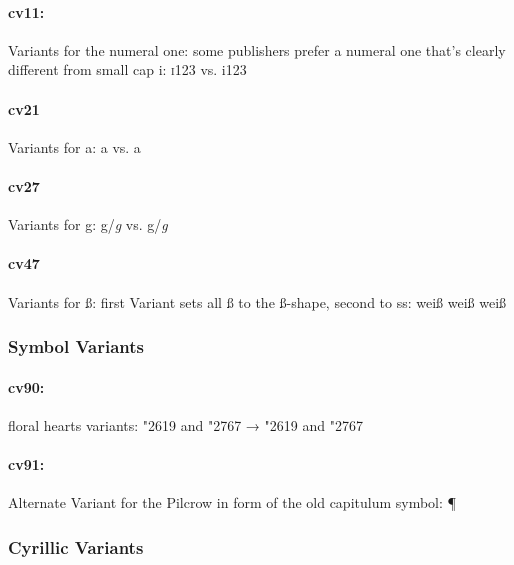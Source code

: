 \documentclass[pagesize,DIV14]{scrartcl}
\begin{document}
\paragraph*{cv11:} Variants for the numeral one: some publishers prefer a numeral one that’s clearly different from small cap i: \textsc{i123} vs. {i123}

\paragraph*{cv21} Variants for a: a vs. {a}

\paragraph*{cv27} Variants for g: g/\textit{g} vs. {g/\textit{g}}

\paragraph*{cv47} Variants for ß: first Variant sets all ß to the ß-shape, second to ss: {weiß {weiß} {weiß}}

\subsubsection{Symbol Variants}
\paragraph*{cv90:} floral hearts variants: \char"2619{}  and \char"2767{}  → {\char"2619{} and \char"2767}

\paragraph*{cv91:} Alternate Variant for the Pilcrow in form of the old capitulum symbol: {¶}

\subsubsection{Cyrillic Variants}
\end{document}
